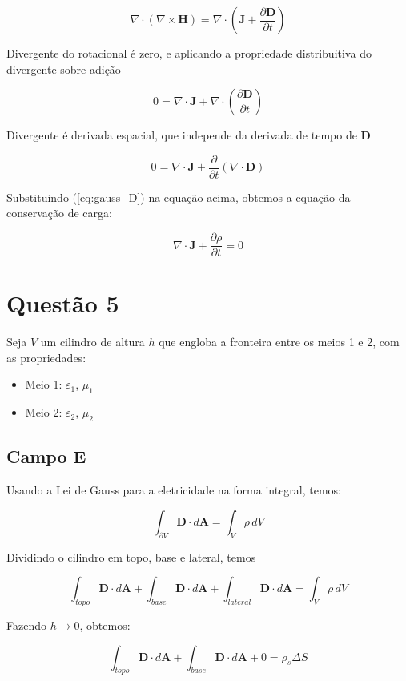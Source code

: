 \[ \nabla \cdot \left( \nabla \times \mathbf{H} \right) = \nabla \cdot \left( \mathbf{J} + \frac{\partial \mathbf{D}}{\partial t} \right) \]

Divergente do rotacional é zero, e aplicando a propriedade distribuitiva do divergente 
sobre adição

\[ 0 = \nabla \cdot \mathbf{J} +  \nabla \cdot \left( \frac{\partial  \mathbf{D}}{\partial t} \right) \]

Divergente é derivada espacial, que independe da derivada de tempo de $\mathbf{D}$

\[ 0 = \nabla \cdot \mathbf{J} +  \frac{\partial }{\partial t} \left(  \nabla \cdot \mathbf{D} \right) \]


Substituindo (\ref{eq:gauss_D}) na equação acima, obtemos a equação da conservação de carga:

\[ \boxed{\nabla \cdot \mathbf{J} + \frac{\partial \rho}{\partial t} = 0} \]

\chapter{Questão 5}\label{cap:q5}

Seja $V$ um cilindro de altura $h$ que engloba a fronteira entre os meios 1 e 2, com as propriedades:

\begin{itemize}
    \item Meio 1: $\varepsilon_1$, $\mu_1$
    \item Meio 2: $\varepsilon_2$, $\mu_2$
\end{itemize}

\section{Campo $\mathbf{E}$ }

Usando a Lei de Gauss para a eletricidade na forma integral, temos:

\[ \int_{\partial V} \mathbf{D} \cdot d\mathbf{A}
= \int_{V} \rho \, dV \]

Dividindo o cilindro em topo, base e lateral, temos 

\[ \int_{topo} \mathbf{D} \cdot d\mathbf{A} + \int_{base} \mathbf{D} \cdot d\mathbf{A} + \int_{lateral} \mathbf{D} \cdot d\mathbf{A}
= \int_{V} \rho \, dV \]

Fazendo $h \to 0$, obtemos:

\[ \int_{topo} \mathbf{D} \cdot d\mathbf{A} + \int_{base} \mathbf{D} \cdot d\mathbf{A} + 0
= \rho_s \Delta S \]

